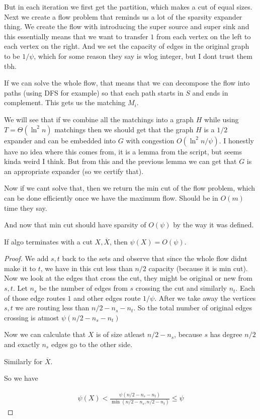 But in each iteration we first get the partition, which makes a cut of equal sizes. Next we create a flow problem that reminds us a lot of the sparsity expander thing. We create the flow with introducing the super source and super sink and this essentially means that we want to transfer $1$ from each vertex on the left to each vertex on the right. And we set the capacity of edges in the original graph to be $1/\psi$, which for some reason they say is wlog integer, but I dont trust them tbh.

If we can solve the whole flow, that means that we can decompose the flow into paths (using DFS for example) so that each path starts in $S$ and ends in complement. This gets us the matching $M_i$.

We will see that if we combine all the matchings into a graph $H$ while using $ T = \Theta(\ln ^2 n)$ matchings then we should get that the graph $H$  is a $1/2$ expander and can be embedded into $G$ with congestion $O(\ln^2 n / \psi)$. I honestly have no idea where this comes from, it is a lemma from the script, but seems kinda weird I think. But from this and the previous lemma we can get that $G$ is an appropriate expander (so we certify that).

Now if we cant solve that, then we return the min cut of the flow problem, which can be done efficiently once we have the maximum flow. Should be in $O(m)$ time they say.

And now that min cut should have sparsity of $O(\psi)$ by the way it was defined.

\begin{lema}
    If algo terminates with a cut $X, \overline{X}$, then $\psi (X) = O(\psi)$.
\end{lema}


\begin{proof}
    We add $s,t$ back to the sets and observe that since the whole flow didnt make it to $t$, we have in this cut less than $n/2$ capacity (because it is min cut). Now we look at the edges that cross the cut, they might be original or new from $s, t$. Let $n_s$ be the number of edges from $s$ crossing the cut and similarly $n_t$. Each of those edge routes $1$ and other edges route $1/\psi$. After we take away the vertices $s,t$ we are routing less than $n/2 - n_s - n_t$. So the total number of original edges crossing is atmost $\psi (n/2 - n_s -n_t)$

    Now we can calculate that $X$ is of size atleast $n/2 - n_s$, because $s$ has degree $n/2$ and exactly $n_s$ edges go to the other side.

    Similarly for $\overline{X}$.

    So we have 

    \begin{align*}
        \psi(X) < \frac{\psi ( n/2 - n_s - n_t)}{\min(n/2 - n_s, n/2 - n_t)} \leq \psi
    \end{align*}
\end{proof}

